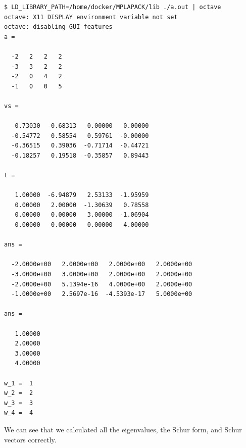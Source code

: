 \documentclass[12pt]{article}
\begin{document}
{\footnotesize
\begin{verbatim}
$ LD_LIBRARY_PATH=/home/docker/MPLAPACK/lib ./a.out | octave
octave: X11 DISPLAY environment variable not set
octave: disabling GUI features
a =

  -2   2   2   2
  -3   3   2   2
  -2   0   4   2
  -1   0   0   5

vs =

  -0.73030  -0.68313   0.00000   0.00000
  -0.54772   0.58554   0.59761  -0.00000
  -0.36515   0.39036  -0.71714  -0.44721
  -0.18257   0.19518  -0.35857   0.89443

t =

   1.00000  -6.94879   2.53133  -1.95959
   0.00000   2.00000  -1.30639   0.78558
   0.00000   0.00000   3.00000  -1.06904
   0.00000   0.00000   0.00000   4.00000

ans =

  -2.0000e+00   2.0000e+00   2.0000e+00   2.0000e+00
  -3.0000e+00   3.0000e+00   2.0000e+00   2.0000e+00
  -2.0000e+00   5.1394e-16   4.0000e+00   2.0000e+00
  -1.0000e+00   2.5697e-16  -4.5393e-17   5.0000e+00

ans =

   1.00000
   2.00000
   3.00000
   4.00000

w_1 =  1
w_2 =  2
w_3 =  3
w_4 =  4
\end{verbatim} }
We can see that we calculated all the eigenvalues, the Schur form, and Schur vectors correctly.
\end{document}
